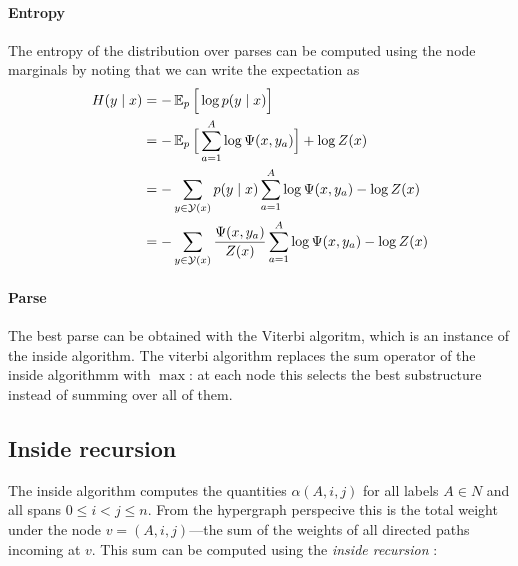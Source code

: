 \paragraph{Entropy}
The entropy of the distribution over parses can be computed using the node marginals by noting that we can write the expectation as
\begin{align*}
  H(y \mid x)
    &= - \operatorname{\mathbb{E}}_{p} \Big[ \log p(y \mid x) \Big]  \\
    &= - \operatorname{\mathbb{E}}_{p} \Big[ \sum_{a=1}^A \log \Psi(x, y_a) \Big] + \log Z(x)  \\
    &= - \sum_{ y \in \mathcal{Y}(x) } p(y \mid x) \sum_{a=1}^A \log \Psi(x, y_a) - \log Z(x)  \\
    &= - \sum_{ y \in \mathcal{Y}(x) } \frac{ \Psi(x, y_a) }{ Z(x) } \sum_{a=1}^A \log \Psi(x, y_a) - \log Z(x)  \\
\end{align*}

\paragraph{Parse}
The best parse can be obtained with the Viterbi algoritm, which is an instance of the inside algorithm. The viterbi algorithm replaces the sum operator of the inside algorithmm with $\max$: at each node this selects the best substructure instead of summing over all of them.

\subsection{Inside recursion}
  The inside algorithm computes the quantities $\alpha(A,i,j)$ for all labels $A \in N$ and all spans $0 \leq i < j \leq n$. From the hypergraph perspecive this is the total weight under the node $v = (A, i, j)$---the sum of the weights of all directed paths incoming at $v$. This sum can be computed using the \textit{inside recursion} \citep{goodman1999semiring}:

